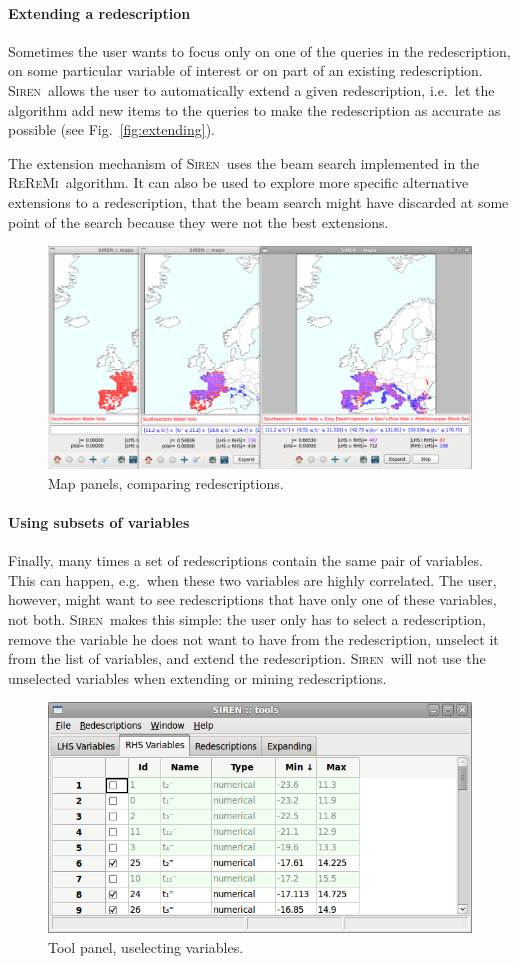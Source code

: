 \documentclass{sig-alternate}
\newcommand{\prg}[1]{\paragraph{#1}}
\newcommand{\Siren}{\textsc{Siren}}
\newcommand{\ReReMi}{\textsc{ReReMi}}
\begin{document}
\prg{Extending a redescription}
Sometimes the user wants to focus only on one of the queries in the
redescription, on some particular variable of interest or on part of an existing redescription. 
\Siren\ allows the user to automatically extend a given
redescription, i.e.\ let the algorithm add new items to the queries to
make the redescription as accurate as possible (see
Fig.~\ref{fig:extending}). 

The extension mechanism of \Siren\ uses the beam search implemented in
the \ReReMi\ algorithm.  It can also be used to explore more specific
alternative extensions to a redescription, that the beam search might
have discarded at some point of the search because they were not the
best extensions.


\begin{figure}
  \centering
\includegraphics[width=\textwidth]{screenshots/comparison.png}
  \caption{Map panels, comparing redescriptions.}
  \label{fig:comparison}
\end{figure}



\prg{Using subsets of variables}
Finally, many times a set of redescriptions contain the same pair of
variables. This can happen, e.g.\ when these two variables are highly
correlated. The user, however, might want to see redescriptions that have
only one of these variables, not both. \Siren\ makes this simple: the user
only has to select a redescription, remove the variable he does not
want to have from the redescription, unselect it from the list of variables, and
extend the redescription. \Siren\ will not use the unselected
variables when extending or mining redescriptions.


\begin{figure}
  \centering
\includegraphics[width=.5\textwidth]{screenshots/variables_05.png}
  \caption{Tool panel, uselecting variables.}
  \label{fig:map_panel}
\end{figure}
\end{document}
